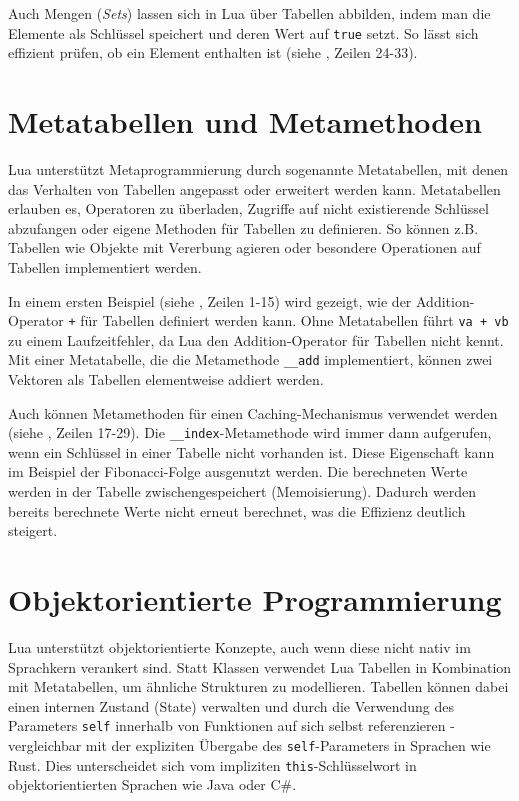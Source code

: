 \documentclass[11pt,a4paper]{article}
\begin{document}
Auch Mengen (\textit{Sets}) lassen sich in Lua über Tabellen abbilden, indem man die Elemente als Schlüssel speichert und deren Wert auf \lstinline|true| setzt. 
So lässt sich effizient prüfen, ob ein Element enthalten ist (siehe , Zeilen 24-33).

\section*{Metatabellen und Metamethoden}

Lua unterstützt Metaprogrammierung durch sogenannte Metatabellen, mit denen das Verhalten von Tabellen angepasst oder erweitert werden kann.
Metatabellen erlauben es, Operatoren zu überladen, Zugriffe auf nicht existierende Schlüssel abzufangen oder eigene Methoden für Tabellen zu definieren.
So können z.B. Tabellen wie Objekte mit Vererbung agieren oder besondere Operationen auf Tabellen implementiert werden.

In einem ersten Beispiel (siehe , Zeilen 1-15) wird gezeigt, wie der Addition-Operator \colorbox{codegray}{\lstinline|+|} für Tabellen definiert werden kann. 
Ohne Metatabellen führt \colorbox{codegray}{\lstinline|va + vb|} zu einem Laufzeitfehler, da Lua den Addition-Operator für Tabellen nicht kennt. 
Mit einer Metatabelle, die die Metamethode \lstinline|__add| implementiert, können zwei Vektoren als Tabellen elementweise addiert werden.

Auch können Metamethoden für einen Caching-Mechanismus verwendet werden (siehe , Zeilen 17-29).
Die \lstinline|__index|-Metamethode wird immer dann aufgerufen, wenn ein Schlüssel in einer Tabelle nicht vorhanden ist.
Diese Eigenschaft kann im Beispiel der Fibonacci-Folge ausgenutzt werden. Die berechneten Werte werden in der Tabelle zwischengespeichert (Memoisierung).
Dadurch werden bereits berechnete Werte nicht erneut berechnet, was die Effizienz deutlich steigert.

\section*{Objektorientierte Programmierung}

Lua unterstützt objektorientierte Konzepte, auch wenn diese nicht nativ im Sprachkern verankert sind. 
Statt Klassen verwendet Lua Tabellen in Kombination mit Metatabellen, um ähnliche Strukturen zu modellieren.
Tabellen können dabei einen internen Zustand (State) verwalten und durch die Verwendung des Parameters \texttt{self} 
innerhalb von Funktionen auf sich selbst referenzieren - vergleichbar mit der expliziten Übergabe des \texttt{self}-Parameters in Sprachen wie Rust. 
Dies unterscheidet sich vom impliziten \texttt{this}-Schlüsselwort in objektorientierten Sprachen wie Java oder C\#.
\end{document}
